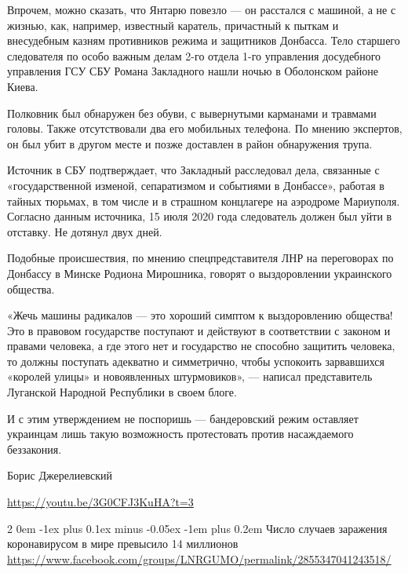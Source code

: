 \documentclass[a4paper,11pt]{extreport}
\makeatletter
\renewcommand\subsection{%
  \clearpage
    \@startsection{subsection}%
    {2}%
    {0em}%
    {-1ex plus 0.1ex minus -0.05ex}%
    {-1em plus 0.2em}%
    {\scshape\bfseries\Large}%
}
\makeatother
\begin{document}
Впрочем, можно сказать, что Янтарю повезло --- он расстался с машиной, а не с
жизнью, как, например, известный каратель, причастный к пыткам и внесудебным
казням противников режима и защитников Донбасса. Тело старшего следователя по
особо важным делам 2-го отдела 1-го управления досудебного управления ГСУ СБУ
Романа Закладного нашли ночью в Оболонском районе Киева.

Полковник был обнаружен без обуви, с вывернутыми карманами и травмами головы.
Также отсутствовали два его мобильных телефона. По мнению экспертов, он был
убит в другом месте и позже доставлен в район обнаружения трупа.

Источник в СБУ подтверждает, что Закладный расследовал дела, связанные с
«государственной изменой, сепаратизмом и событиями в Донбассе», работая в
тайных тюрьмах, в том числе и в страшном концлагере на аэродроме Мариуполя.
Согласно данным источника, 15 июля 2020 года следователь должен был уйти в
отставку. Не дотянул двух дней.

Подобные происшествия, по мнению спецпредставителя ЛНР на переговорах по
Донбассу в Минске Родиона Мирошника, говорят о выздоровлении украинского
общества.

«Жечь машины радикалов --- это хороший симптом к выздоровлению общества! Это в
правовом государстве поступают и действуют в соответствии с законом и правами
человека, а где этого нет и государство не способно защитить человека, то
должны поступать адекватно и симметрично, чтобы успокоить зарвавшихся «королей
улицы» и новоявленных штурмовиков», --- написал представитель Луганской Народной
Республики в своем блоге.

И с этим утверждением не поспоришь --- бандеровский режим оставляет украинцам
лишь такую возможность протестовать против насаждаемого беззакония.

Борис Джерелиевский

\url{https://youtu.be/3G0CFJ3KuHA?t=3}
 
 
\subsection{Число случаев заражения коронавирусом в мире превысило 14 миллионов}
\label{sec:18_07_2020.fb.lnr.15}
\url{https://www.facebook.com/groups/LNRGUMO/permalink/2855347041243518/}
\end{document}
